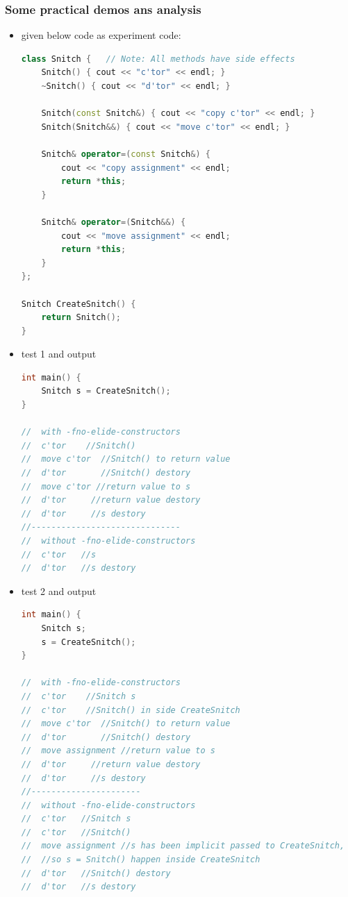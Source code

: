\documentclass[a4paper,11pt,twoside]{book}
\begin{document}
\subsubsection{Some practical demos ans analysis}
\begin{itemize}
	
	\item given below code as experiment code:
\begin{lstlisting}[frame=single, language=c++]
class Snitch {   // Note: All methods have side effects
	Snitch() { cout << "c'tor" << endl; }
	~Snitch() { cout << "d'tor" << endl; }
	
	Snitch(const Snitch&) { cout << "copy c'tor" << endl; }
	Snitch(Snitch&&) { cout << "move c'tor" << endl; }
	
	Snitch& operator=(const Snitch&) {
		cout << "copy assignment" << endl;
		return *this;
	}
	
	Snitch& operator=(Snitch&&) {
		cout << "move assignment" << endl;
		return *this;
	}
};
	
Snitch CreateSnitch() {
	return Snitch();
}
	\end{lstlisting}
	
	\item test 1 and output 
\begin{lstlisting}[frame=single, language=c++]
int main() {
	Snitch s = CreateSnitch();
}
	
//	with -fno-elide-constructors
//	c'tor    //Snitch()
//	move c'tor  //Snitch() to return value
//	d'tor       //Snitch() destory
//	move c'tor //return value to s
//	d'tor     //return value destory
//	d'tor     //s destory
//------------------------------
//	without -fno-elide-constructors
//	c'tor   //s
//	d'tor   //s destory
	\end{lstlisting}
	
	\item test 2 and output
	\begin{lstlisting}[frame=single, language=c++]
int main() {
	Snitch s;
	s = CreateSnitch();
}

//	with -fno-elide-constructors
//	c'tor    //Snitch s
//	c'tor    //Snitch() in side CreateSnitch
//	move c'tor  //Snitch() to return value
//	d'tor       //Snitch() destory
//	move assignment //return value to s
//	d'tor     //return value destory
//	d'tor     //s destory
//----------------------	
//	without -fno-elide-constructors
//	c'tor   //Snitch s
//	c'tor   //Snitch()
//	move assignment //s has been implicit passed to CreateSnitch, 
//	//so s = Snitch() happen inside CreateSnitch
//	d'tor   //Snitch() destory
//	d'tor   //s destory
	\end{lstlisting}
	

\end{itemize}
\end{document}
